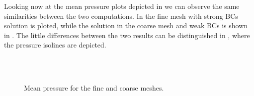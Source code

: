 Looking now at the mean pressure plots depicted in  we can observe the same similarities between the two computations. In  the fine mesh with strong BCs solution is ploted, while the solution in the coarse mesh and weak BCs is shown in . The little differences between the two results can be distinguished in , where the pressure isolines are depicted.
\begin{figure}[h!]
  \centering
  \\
  \\
  \caption{Mean pressure for the fine and coarse meshes.}
  \label{fig-NACA_mean_press}
\end{figure}

